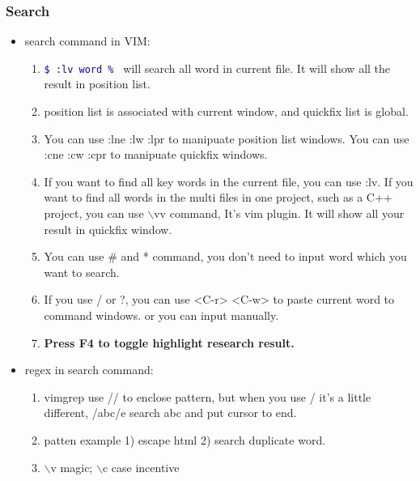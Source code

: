 \documentclass[a4paper,12pt,twoside]{book}
\newcommand{\linuxcommand}[1]{\texttt{\textcolor{blue}{\$ #1 \Pisymbol{psy}{191}}}}
\begin{document}
\subsubsection{Search}

\begin{itemize}
\item search command in VIM:
		\begin{enumerate}
				\item \linuxcommand{:lv word \%} will search all word in current file. It will show all the result in position list. 

				\item position list is associated with current window, and quickfix list is global.

				\item You can use :lne :lw :lpr to manipuate position list windows. You can use :cne :cw :cpr to manipuate quickfix windows. 

				\item If you want to find all key words in the current file, you can use :lv. If you want to find all words in the multi files in one project, such as a C++ project, you can use $\backslash$vv command, It's vim plugin. It will show all your result in quickfix window. 

				\item You can use \# and * command, you don't need to input word which you want to search. 

				\item If you use / or ?, you can use <C-r> <C-w> to paste current word to command windows. or you can input manually. 

				\item \textbf{Press F4 to toggle highlight research result.} 

		\end{enumerate}
\item regex in search command:
		\begin{enumerate}

				\item vimgrep use // to enclose pattern, but when you use / it's a little different, /abc/e search abc and put cursor to end.

				\item patten example 1) escape html 2) search duplicate word. 

				\item $\backslash$v magic; $\backslash$c case incentive


\end{enumerate}
\end{itemize}
\end{document}
